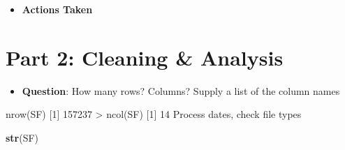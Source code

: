 \documentclass[]{book}
\newenvironment{Shaded}{\begin{snugshade}}{\end{snugshade}}
\newcommand{\KeywordTok}[1]{\textcolor[rgb]{0.13,0.29,0.53}{\textbf{#1}}}
\newcommand{\NormalTok}[1]{#1}
\newcommand{\OperatorTok}[1]{\textcolor[rgb]{0.81,0.36,0.00}{\textbf{#1}}}
\newcommand{\StringTok}[1]{\textcolor[rgb]{0.31,0.60,0.02}{#1}}
\providecommand{\tightlist}{%
  \setlength{\itemsep}{0pt}\setlength{\parskip}{0pt}}
\begin{document}
\begin{Shaded}
\end{Shaded}

\begin{itemize}
\tightlist
\item
  \textbf{Actions Taken}
\end{itemize}

\begin{Shaded}
\end{Shaded}

\hypertarget{part-2-cleaning-analysis}{%
\chapter{Part 2: Cleaning \& Analysis}\label{part-2-cleaning-analysis}}

\begin{itemize}
\tightlist
\item
  \textbf{Question}: How many rows? Columns? Supply a list of the column names
\end{itemize}

nrow(SF)
{[}1{]} 157237
\textgreater{} ncol(SF)
{[}1{]} 14
Process dates, check file types

\begin{Shaded}
\begin{Highlighting}[]
\KeywordTok{str}\NormalTok{(SF)}
\end{Highlighting}
\end{Shaded}
\end{document}
